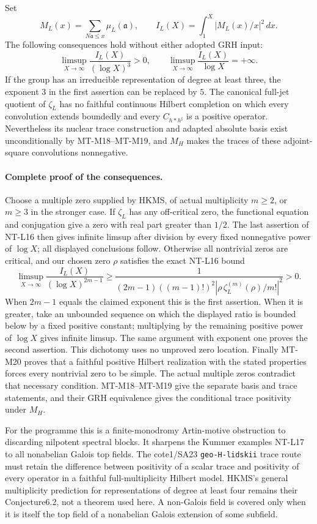 Set
\[
 M_L(x)=\sum_{N\mathfrak a\le x}\mu_L(\mathfrak a),\qquad
 I_L(X)=\int_1^X|M_L(x)/x|^2\,dx.
\]
The following consequences hold without either adopted GRH input:
\[
 \limsup_{X\to\infty}\frac{I_L(X)}{(\log X)^3}>0,
 \qquad
 \limsup_{X\to\infty}\frac{I_L(X)}{\log X}=+\infty.
 \tag{MT-M23a}
\]
If the group has an irreducible representation of degree at least
three, the exponent $3$ in the first assertion can be replaced by
$5$. The canonical full-jet quotient of $\zeta_L$ has no faithful
continuous Hilbert completion on which every convolution extends
boundedly and every $C_{h*h^\sharp}$ is a positive operator.
Nevertheless its nuclear trace construction and adapted absolute
basis exist unconditionally by MT-M18--MT-M19, and $M_H$ makes
the traces of these adjoint-square convolutions nonnegative.

\paragraph{Complete proof of the consequences.}
Choose a multiple zero supplied by HKMS, of actual multiplicity
$m\ge2$, or $m\ge3$ in the stronger case. If $\zeta_L$ has any
off-critical zero, the functional equation and conjugation give
a zero with real part greater than $1/2$. The last assertion of
NT-L16 then gives infinite limsup after division by every fixed
nonnegative power of $\log X$; all displayed conclusions follow.
Otherwise all nontrivial zeros are critical, and our chosen zero
$\rho$ satisfies the exact NT-L16 bound
\[
 \limsup_{X\to\infty}\frac{I_L(X)}{(\log X)^{2m-1}}
 \ge
 \frac{1}{(2m-1)((m-1)!)^2
       |\rho\,\zeta_L^{(m)}(\rho)/m!|^2}>0.
\]
When $2m-1$ equals the claimed exponent this is the first assertion.
When it is greater, take an unbounded sequence on which the
displayed ratio is bounded below by a fixed positive constant;
multiplying by the remaining positive power of $\log X$ gives
infinite limsup. The same argument with exponent one proves
the second assertion. This dichotomy uses no unproved zero
location. Finally MT-M20 proves that a faithful positive Hilbert
realization with the stated properties forces every nontrivial
zero to be simple. The actual multiple zeros contradict that
necessary condition. MT-M18--MT-M19 give the separate basis and
trace statements, and their GRH equivalence gives the conditional
trace positivity under $M_H$.

For the programme this is a finite-monodromy Artin-motive
obstruction to discarding nilpotent spectral blocks. It sharpens
the Kummer examples NT-L17 to all nonabelian Galois top fields.
The cote1/SA23 \texttt{geo-H-lidskii} trace route must retain the
difference between positivity of a scalar trace and positivity
of every operator in a faithful full-multiplicity Hilbert model.
HKMS's general multiplicity prediction for representations of
degree at least four remains their Conjecture6.2, not a theorem
used here. A non-Galois field is covered only when it is itself
the top field of a nonabelian Galois extension of some subfield.



